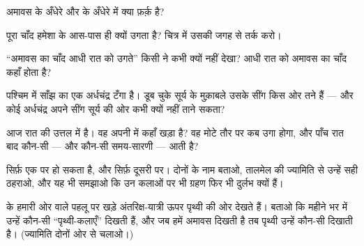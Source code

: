 \begin{exercise}[$\star$]\label{exo:g7:moon-phases:5}
अमावस के अँधेरे और  के अँधेरे में क्या फ़र्क़ है?
\end{exercise}

\begin{exercise}[$\star$]\label{exo:g7:moon-phases:6}
पूरा चाँद हमेशा  के आस-पास ही क्यों उगता है? चित्र में उसकी
जगह से तर्क करो।
\end{exercise}

\begin{exercise}[$\star$]\label{exo:g7:moon-phases:7}
``अमावस का चाँद आधी रात को उगते'' किसी ने कभी क्यों नहीं देखा? आधी
रात को अमावस का चाँद कहाँ होता है?
\end{exercise}

\begin{exercise}[$\star$]\label{exo:g7:moon-phases:8}
पश्चिम में साँझ का एक अर्धचंद्र टँगा है। डूब चुके सूर्य के मुक़ाबले
उसके सींग किस ओर तने हैं --- और कोई अर्धचंद्र अपने सींग सूर्य की ओर
कभी क्यों नहीं ताने सकता?
\end{exercise}

\begin{exercise}[$\star\star$]\label{exo:g7:moon-phases:9}
आज रात   की उत्तल  में है। वह अपनी  में कहाँ
खड़ा है? वह मोटे तौर पर कब उगा होगा, और पाँच रात बाद कौन-सी  ---
और कौन-सी समय-सारणी --- आती है?
\end{exercise}

\begin{exercise}[$\star\star$]\label{exo:g7:moon-phases:10}
 सिर्फ़ एक  पर हो सकता है, और  सिर्फ़ दूसरी
पर। दोनों के नाम बताओ, तालमेल की ज्यामिति से उन्हें सही ठहराओ, और यह
भी समझाओ कि उन कलाओं पर भी ग्रहण फिर भी दुर्लभ क्यों हैं।
\end{exercise}

\begin{exercise}[$\star\star$]\label{exo:g7:moon-phases:11}
 के हमारी ओर वाले पहलू पर खड़े अंतरिक्ष-यात्री ऊपर पृथ्वी की
ओर देखते हैं। बताओ कि महीने भर में उन्हें कौन-सी ``पृथ्वी-कलाएँ''
दिखती हैं, और जब हमें अमावस दिखती है तब पृथ्वी उन्हें कौन-सी 
दिखाती है। (ज्यामिति दोनों ओर से चलाओ।)
\end{exercise}

